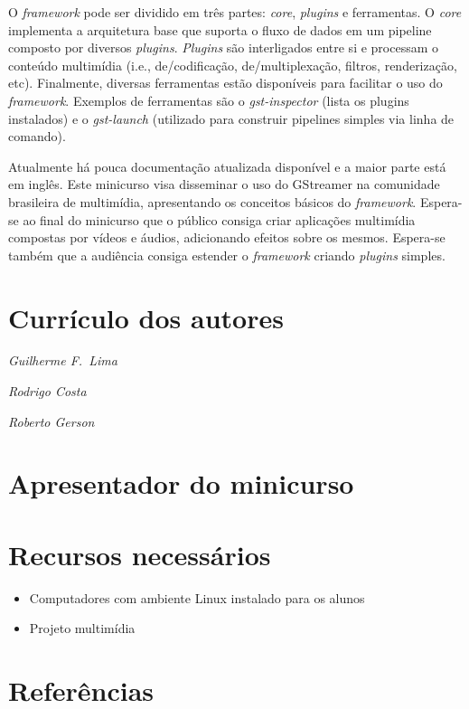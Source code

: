 \documentclass{SBCbookchapter}
\begin{document}
O \emph{framework} pode ser dividido em três partes: \emph{core}, \emph{plugins}
e ferramentas. O \emph{core} implementa a arquitetura base que suporta o
fluxo de dados em um pipeline composto por diversos \emph{plugins}. 
\emph{Plugins} são interligados entre si e processam o conteúdo multimídia
(i.e., de/codificação, de/multiplexação, filtros, renderização, etc).
Finalmente, diversas ferramentas estão disponíveis para facilitar
o uso do \emph{framework}. Exemplos de ferramentas são o 
\emph{gst-inspector} (lista os plugins instalados) e o \emph{gst-launch} 
(utilizado para construir pipelines simples via linha de comando).

Atualmente há pouca documentação atualizada disponível e a maior parte
está em inglês. Este minicurso visa disseminar o uso do GStreamer na comunidade 
brasileira de multimídia, apresentando os conceitos básicos do 
\emph{framework}. Espera-se ao final do minicurso que o público
consiga criar aplicações multimídia compostas por vídeos e áudios,
adicionando efeitos sobre os mesmos. Espera-se também que a audiência
consiga estender o \emph{framework} criando \emph{plugins} simples.



\section{Currículo dos autores}

\noindent\emph{Guilherme F.~Lima}

\noindent\emph{Rodrigo Costa}

\noindent\emph{Roberto Gerson}


\section{Apresentador do minicurso}


\section{Recursos necessários}
\begin{itemize}
  \item Computadores com ambiente Linux instalado para os alunos
  \item Projeto multimídia 
\end{itemize}


\section*{Referências}
\end{document}
